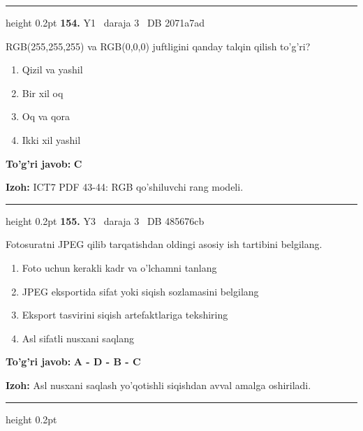 \documentclass[10pt,a4paper,oneside]{article}
\begin{document}
\vspace{2mm}\hrule height 0.2pt \vspace{4mm}
\hypertarget{q154}{\textbf{\color{ink}154.}}  {\color{muted}\scriptsize Y1 \textbullet\ daraja 3 \textbullet\ DB 2071a7ad}
\par
RGB(255,255,255) va RGB(0,0,0) juftligini qanday talqin qilish to'g'ri?
\begin{enumerate}[label=\Alph*),leftmargin=9mm]
\item Qizil va yashil
\item Bir xil oq
\item Oq va qora
\item Ikki xil yashil
\end{enumerate}
\begin{tcolorbox}[enhanced,breakable,colback=teal!4,colframe=teal!45!black,boxrule=0.45pt,arc=1.2mm,left=2.8mm,right=2.8mm,top=2mm,bottom=2mm,before skip=2mm,after skip=2mm]
\textbf{\color{teal}To'g'ri javob:} \textbf{C}
\par\smallskip
\textbf{Izoh:} ICT7 PDF 43-44: RGB qo'shiluvchi rang modeli.
\end{tcolorbox}
\vspace{2mm}\hrule height 0.2pt \vspace{4mm}
\hypertarget{q155}{\textbf{\color{ink}155.}}  {\color{muted}\scriptsize Y3 \textbullet\ daraja 3 \textbullet\ DB 485676cb}
\par
Fotosuratni JPEG qilib tarqatishdan oldingi asosiy ish tartibini belgilang.
\begin{enumerate}[label=\Alph*),leftmargin=9mm]
\item Foto uchun kerakli kadr va o'lchamni tanlang
\item JPEG eksportida sifat yoki siqish sozlamasini belgilang
\item Eksport tasvirini siqish artefaktlariga tekshiring
\item Asl sifatli nusxani saqlang
\end{enumerate}
\begin{tcolorbox}[enhanced,breakable,colback=teal!4,colframe=teal!45!black,boxrule=0.45pt,arc=1.2mm,left=2.8mm,right=2.8mm,top=2mm,bottom=2mm,before skip=2mm,after skip=2mm]
\textbf{\color{teal}To'g'ri javob:} \textbf{A - D - B - C}
\par\smallskip
\textbf{Izoh:} Asl nusxani saqlash yo'qotishli siqishdan avval amalga oshiriladi.
\end{tcolorbox}
\vspace{2mm}\hrule height 0.2pt \vspace{4mm}
\end{document}
